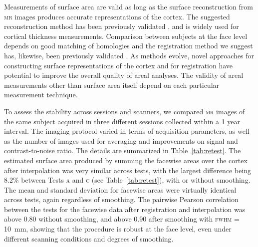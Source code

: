 Measurements of surface area are valid as long as the surface reconstruction from \textsc{mr} images produces accurate representations of the cortex. The suggested reconstruction method has been previously validated \citep{Fischl2000}, and is widely used for cortical thickness measurements. Comparison between subjects at the face level depends on good matching of homologies and the registration method we suggest has, likewise, been previously validated \citep{Yeo2010, Klein2010}. As methods evolve, novel approaches for constructing surface representations of the cortex and for registration have potential to improve the overall quality of areal analyses. The validity of areal measurements other than surface area itself depend on each particular measurement technique.

To assess the stability across sessions and scanners, we compared \textsc{mr} images of the same subject acquired in three different sessions collected within a 1 year interval. The imaging protocol varied in terms of acquisition parameters, as well as the number of images used for averaging and improvements on signal and contrast-to-noise ratio. The details are summarized in Table~\ref{tab:retest}. The estimated surface area produced by summing the facewise areas over the cortex after interpolation was very similar across tests, with the largest difference being 8.2\% between Tests \textsc{a} and \textsc{c} (see Table~\ref{tab:retest}), with or without smoothing. The mean and standard deviation for facewise areas were virtually identical across tests, again regardless of smoothing. The pairwise Pearson correlation between the tests for the facewise data after registration and interpolation was above 0.80 without smoothing, and above 0.90 after smoothing with \textsc{fwhm} = 10~mm, showing that the procedure is robust at the face level, even under different scanning conditions and degrees of smoothing.

